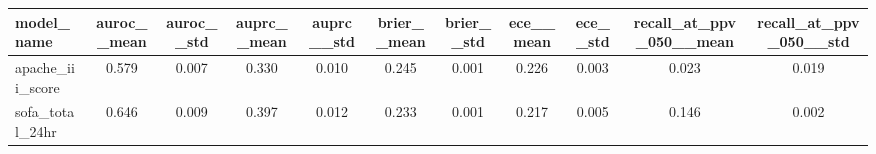\begin{tabular}{@{}lcccccccccc@{}}
\toprule
model\_name & auroc\_\_mean & auroc\_\_std & auprc\_\_mean & auprc\_\_std & brier\_\_mean & brier\_\_std & ece\_\_mean & ece\_\_std & recall\_at\_ppv\_050\_\_mean & recall\_at\_ppv\_050\_\_std\\
\midrule
apache\_iii\_score & 0.579 & 0.007 & 0.330 & 0.010 & 0.245 & 0.001 & 0.226 & 0.003 & 0.023 & 0.019\\
sofa\_total\_24hr & 0.646 & 0.009 & 0.397 & 0.012 & 0.233 & 0.001 & 0.217 & 0.005 & 0.146 & 0.002\\
\bottomrule
\end{tabular}
